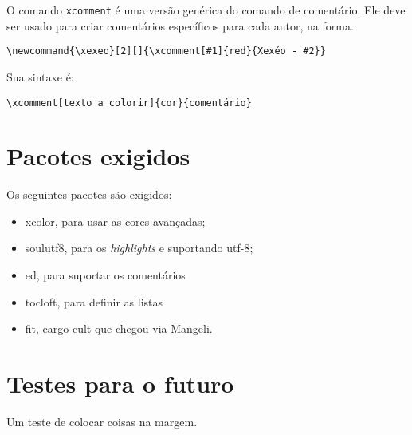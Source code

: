 \documentclass{article}
\begin{document}
O comando \verb!xcomment! é uma versão genérica do comando de comentário. Ele deve ser usado para criar comentários específicos para cada autor, na forma.

\begin{verbatim}
\newcommand{\xexeo}[2][]{\xcomment[#1]{red}{Xexéo - #2}}
\end{verbatim}

Sua sintaxe é:
\begin{verbatim}
\xcomment[texto a colorir]{cor}{comentário}
\end{verbatim}

\section{Pacotes exigidos}

Os seguintes pacotes são exigidos:
\begin{itemize}
    \item xcolor, para usar as cores avançadas;
    \item soulutf8, para os \textit{highlights} e suportando utf-8;
    \item ed, para suportar os comentários
    \item tocloft, para definir as listas 
    \item fit, cargo cult que chegou via Mangeli.
\end{itemize}

\section{Testes para o futuro}

Um teste de colocar coisas na margem.

\printbibliography


\newpage
\listofassunto
\newpage
\listofcomentario
\end{document}
